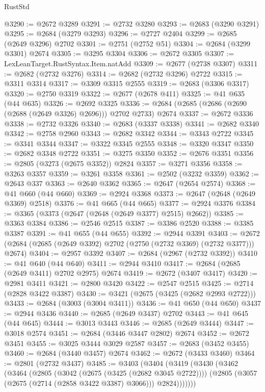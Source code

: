 \begin{lexlean}{RustStd}
\begin{coremodule}
@3290 := @2672 @3289
@3291 := @2732 @3280
@3293 := @2683 (@3290 @3291)
@3295 := @2684 (@3279 @3293)
@3296 := @2727 @2404
@3299 := @2685 (@2649 @3296) @2702
@3301 := @2751 (@2752 @51)
@3304 := @2684 (@3299 @3301) @2674
@3305 := @3295 @3304
@3306 := @2672 @3305
@3307 := LexLeanTarget.RustSyntax.Item.natAdd
@3309 := @2677 (@2738 @3307)
@3311 := @2682 (@2732 @3276)
@3314 := @2682 (@2732 @3296) @2722
@3315 := @3311 @3314
@3317 := @3309 @3315 @2555
@3319 := @2683 (@3306 @3317)
@3320 := @2750 @3319
@3322 := @2677 (@2678 @411)
@3325 := @41 @635 (@44 @635)
@3326 := @2692 @3325
@3336 := @2684 (@2685 (@2686 (@2690 (@2688 (@2649 @3326) @2696))) @2702 @2733) @2674
@3337 := @2672 @3336
@3338 := @2732 @3326
@3340 := @2683 (@3337 @3338)
@3341 := @2682 @3340
@3342 := @2758 @2960
@3343 := @2682 @3342
@3344 := @3343 @2722
@3345 := @3341 @3344
@3347 := @3322 @3345 @2555
@3348 := @3320 @3347
@3350 := @2682 @3348 @2722
@3351 := @3275 @3350
@3352 := @2676 @3351
@3356 := @2805 (@3273 (@2675 @3352)) @2824
@3357 := @3271 @3356
@3358 := @3263 @3357
@3359 := @3261 @3358
@3361 := @2502 (@3232 @3359)
@3362 := @2643 @337
@3363 := @2640 @3362
@3365 := @2647 (@2654 @2574)
@3368 := @41 @660 (@44 @660)
@3369 := @2924 @3368
@3373 := @2647 (@2648 (@2649 @3369) @2518)
@3376 := @41 @665 (@44 @665)
@3377 := @2924 @3376
@3384 := @3365 (@3373 (@2647 (@2648 (@2649 @3377) @2515) @2662))
@3385 := @3363 @3384
@3386 := @2546 @2515
@3387 := @3386 @2520
@3388 := @3385 @3387
@3391 := @41 @655 (@44 @655)
@3392 := @2944 @3391
@3403 := @2672 (@2684 (@2685 (@2649 @3392) @2702 (@2750 (@2732 @3369) (@2732 @3377))) @2674)
@3404 := @2957 @3392
@3407 := @2684 (@2967 (@2732 @3392))
@3410 := @41 @640 (@44 @640)
@3411 := @2944 @3410
@3417 := @2684 (@2685 (@2649 @3411) @2702 @2975) @2674
@3419 := @2672 (@3407 @3417)
@3420 := @2981 @3411
@3421 := @2800 @3420
@3422 := @2547 @2515
@3425 := @2714 (@2828 @3422 @3387)
@3430 := @3421 (@2675 (@3425 (@2682 @2993 @2722)))
@3433 := @2684 (@3003 (@3004 @3411))
@3436 := @41 @650 (@44 @650)
@3437 := @2944 @3436
@3440 := @2685 (@2649 @3437) @2702
@3443 := @41 @645 (@44 @645)
@3444 := @3013 @3443
@3446 := @2685 (@2649 @3444)
@3447 := @3018 @2574
@3451 := @2684 (@3446 @3447 @2802) @2674
@3452 := @2672 @3451
@3455 := @3025 @3444 @3029 @2587
@3457 := @2683 (@3452 @3455)
@3460 := @2684 (@3440 @3457) @2674
@3462 := @2672 (@3433 @3460)
@3464 := @2801 (@2732 @3437)
@3485 := @3403
    (@3404
      (@3419
        (@3430
          (@3462
            (@3464
              (@2805
                (@3042 (@2675 (@3425 (@2682 @3045 @2722))))
                (@2805 (@3057 (@2675 (@2714 (@2858 @3422 @3387) @3066))) @2824)))))))

\end{coremodule}
\end{lexlean}
